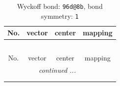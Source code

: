 \documentclass[fleqn,8pt]{jsarticle}
\begin{document}
\renewcommand{\arraystretch}{1.2}
\begin{longtable}{cccc}
\caption{Wyckoff bond: {\tt 96d@8b}, bond symmetry: {\tt 1}}
 \\
 \hline \hline
No. & vector & center & mapping \\ \hline \endfirsthead

\multicolumn{3}{l}{\tablename\ \thetable{}} \\
 \hline \hline
No. & vector & center & mapping \\ \hline \endhead

 \hline \hline
\multicolumn{3}{r}{\footnotesize\it continued ...} \\ \endfoot

 \hline \hline
\multicolumn{3}{r}{} \\ \endlastfoot


\end{longtable}
\end{document}
